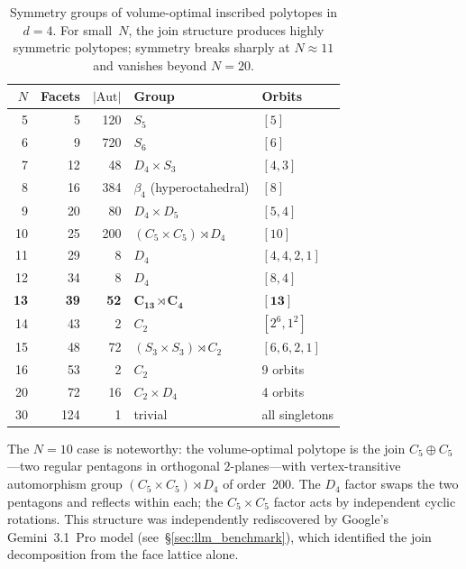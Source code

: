 \documentclass[11pt]{article}
\begin{document}
\begin{table}[ht]
\centering
\caption{Symmetry groups of volume-optimal inscribed polytopes in $d = 4$.
For small~$N$, the join structure produces highly symmetric polytopes;
symmetry breaks sharply at $N \approx 11$ and vanishes beyond $N = 20$.}
\label{tab:symmetry_d4}
\smallskip
\begin{tabular}{r r r l l}
\toprule
$N$ & Facets & $|\mathrm{Aut}|$ & Group & Orbits \\
\midrule
5  & 5  & 120     & $S_5$            & $[5]$    \\
6  & 9  & 720     & $S_6$            & $[6]$    \\
7  & 12 & 48      & $D_4 \times S_3$ & $[4,3]$  \\
8  & 16 & 384     & $\beta_4$ (hyperoctahedral) & $[8]$    \\
9  & 20 & 80      & $D_4 \times D_5$ & $[5,4]$  \\
10 & 25 & 200     & $(C_5 \times C_5) \rtimes D_4$ & $[10]$   \\
\midrule
11 & 29 & 8       & $D_4$            & $[4,4,2,1]$ \\
12 & 34 & 8       & $D_4$            & $[8,4]$  \\
\textbf{13} & \textbf{39} & \textbf{52} & $\mathbf{C_{13} \rtimes C_4}$ & $\mathbf{[13]}$ \\
14 & 43 & 2       & $C_2$            & $[2^6,1^2]$ \\
15 & 48 & 72      & $(S_3 \times S_3) \rtimes C_2$ & $[6,6,2,1]$ \\
16 & 53 & 2       & $C_2$            & 9 orbits \\
20 & 72 & 16      & $C_2 \times D_4$ & 4 orbits \\
30 & 124& 1       & trivial          & all singletons \\
\bottomrule
\end{tabular}
\end{table}

The $N = 10$ case is noteworthy: the volume-optimal polytope is the
join $C_5 \oplus C_5$---two regular pentagons in orthogonal
$2$-planes---with vertex-transitive automorphism group
$(C_5 \times C_5) \rtimes D_4$ of order~200.  The $D_4$ factor swaps
the two pentagons and reflects within each; the $C_5 \times C_5$
factor acts by independent cyclic rotations.  This structure was
independently rediscovered by Google's Gemini~3.1~Pro model
(see~\S\ref{sec:llm_benchmark}), which identified the join
decomposition from the face lattice alone.
\end{document}
